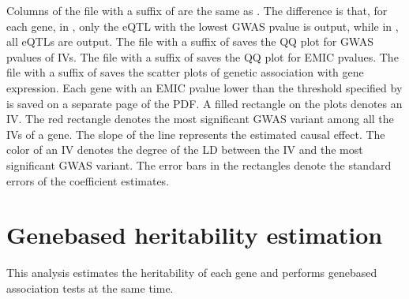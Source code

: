 \documentclass[letterpaper,10pt,english,openany,oneside]{sphinxmanual}
\begin{document}
\sphinxAtStartPar
Columns of the file with a suffix of  are the same as . The difference is that, for each gene, in , only the eQTL with the lowest GWAS p\sphinxhyphen{}value is output, while in , all eQTLs are output. The file with a suffix of  saves the Q\sphinxhyphen{}Q plot for GWAS p\sphinxhyphen{}values of IVs. The file with a suffix of  saves the Q\sphinxhyphen{}Q plot for EMIC p\sphinxhyphen{}values. The file with a suffix of  saves the scatter plots of genetic association with gene expression. Each gene with an EMIC p\sphinxhyphen{}value lower than the threshold specified by  is saved on a separate page of the PDF. A filled rectangle on the plots denotes an IV. The red rectangle denotes the most significant GWAS variant among all the IVs of a gene. The slope of the line represents the estimated causal effect. The color of an IV denotes the degree of the LD between the IV and the most significant GWAS variant. The error bars in the rectangles denote the standard errors of the coefficient estimates.


\section{Gene\sphinxhyphen{}based heritability estimation}
\label{\detokenize{detailed_document:gene-based-heritability-estimation}}\label{\detokenize{detailed_document:detail-h2}}
\sphinxAtStartPar
This analysis estimates the heritability of each gene and performs gene\sphinxhyphen{}based association tests at the same time.
\end{document}
